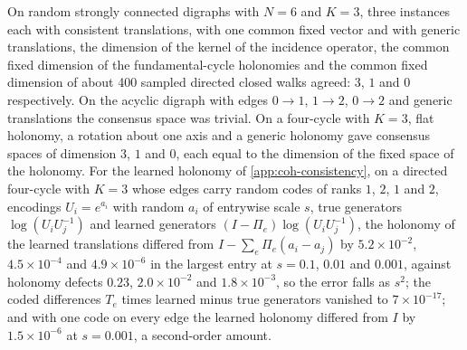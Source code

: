 \begin{numcheck}\label{chk:coh-holonomy}
On random strongly connected digraphs with $N=6$ and $K=3$, three instances each with consistent translations, with one common fixed vector and with generic translations, the dimension of the kernel of the incidence operator, the common fixed dimension of the fundamental-cycle holonomies and the common fixed dimension of about 400 sampled directed closed walks agreed: $3$, $1$ and $0$ respectively. On the acyclic digraph with edges $0\to1$, $1\to2$, $0\to2$ and generic translations the consensus space was trivial. On a four-cycle with $K=3$, flat holonomy, a rotation about one axis and a generic holonomy gave consensus spaces of dimension $3$, $1$ and $0$, each equal to the dimension of the fixed space of the holonomy. For the learned holonomy of \cref{app:coh-consistency}, on a directed four-cycle with $K=3$ whose edges carry random codes of ranks $1$, $2$, $1$ and $2$, encodings $U_i=e^{a_i}$ with random $a_i$ of entrywise scale $s$, true generators $\log(U_iU_j^{-1})$ and learned generators $(I-\Pi_e)\log(U_iU_j^{-1})$, the holonomy of the learned translations differed from $I-\sum_e\Pi_e(a_i-a_j)$ by $5.2\times10^{-2}$, $4.5\times10^{-4}$ and $4.9\times10^{-6}$ in the largest entry at $s=0.1$, $0.01$ and $0.001$, against holonomy defects $0.23$, $2.0\times10^{-2}$ and $1.8\times10^{-3}$, so the error falls as $s^2$; the coded differences $T_e$ times learned minus true generators vanished to $7\times10^{-17}$; and with one code on every edge the learned holonomy differed from $I$ by $1.5\times10^{-6}$ at $s=0.001$, a second-order amount.
\end{numcheck}

